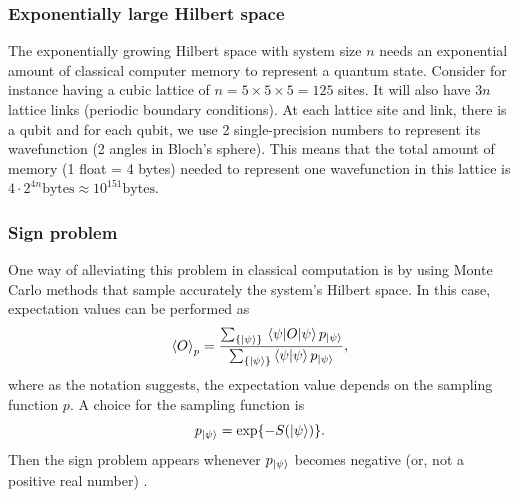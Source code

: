 \documentclass[a4paper]{report}
\begin{document}
\begin{spacing}{1.1}
\subsubsection{Exponentially large Hilbert space}
The exponentially growing Hilbert space with system size $n$ needs an exponential amount of classical computer memory to represent a quantum state. Consider for instance having a cubic lattice of $n = 5 \times 5 \times 5 = 125$ sites. It will also have $3 n$ lattice links (periodic boundary conditions). At each lattice site and link, there is a qubit and for each qubit, we use 2 single-precision numbers to represent its wavefunction (2 angles in Bloch's sphere). This means that the total amount of memory (1 float = 4 bytes) needed to represent one wavefunction in this lattice is $4\cdot2^{4n} \text{bytes} \approx 10^{151} \text{bytes}$.

\subsubsection{Sign problem}
One way of alleviating this problem in classical computation is by using Monte Carlo methods that sample accurately the system's Hilbert space. In this case, expectation values can be performed as
\begin{equation}
    \expval{O}_p = \frac{\sum_{\{\ket{\psi}\}} \ev{O}{\psi} p_{\ket{\psi}} }{\sum_{\{\ket{\psi}\}} \braket{\psi} p_{\ket{\psi}} },
\end{equation}
where as the notation suggests, the expectation value depends on the sampling function $p$. A choice for the sampling function is
\begin{equation}
    p_{\ket{\psi}} = \exp{- {S}({\ket{\psi}})}.%
\end{equation}
Then the sign problem appears whenever $p_{\ket{\psi}}$ becomes negative (or, not a positive real number) \cite{chandrasekharan1999meron}.




\end{spacing}
\end{document}
